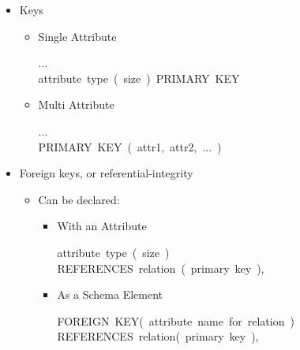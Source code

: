 \documentclass{article}
\begin{document}
\begin{itemize}%

\item{}
Keys%

\begin{itemize}%

\item{}
Single Attribute%
\begin{mdpre}%
\noindent...\\
attribute~type~(~size~)~PRIMARY~KEY%
\end{mdpre}%

\item{}
Multi Attribute%
\begin{mdpre}%
\noindent...\\
PRIMARY~KEY~(~attr1,~attr2,~...~)%
\end{mdpre}%
\end{itemize}%

\item{}
Foreign keys, or referential-integrity%

\begin{itemize}%

\item{}
Can be declared:%

\begin{itemize}%

\item{}
With an Attribute%
\begin{mdpre}%
\noindent attribute~type~(~size~)~\\
REFERENCES~relation~(~primary~key~),%
\end{mdpre}%

\item{}
As a Schema Element%
\begin{mdpre}%
\noindent FOREIGN~KEY(~attribute~name~for~relation~)\\
REFERENCES~relation(~primary~key~),%
\end{mdpre}%


\end{itemize}
\end{itemize}
\end{itemize}
\end{document}
